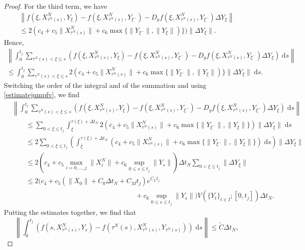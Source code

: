 \documentclass[reqno,12pt]{amsart}
\theoremstyle{plain} %
\theoremstyle{definition} %
\begin{document}
\begin{proof}
    For the third term, we have
    \begin{multline*}
        \left\|f(\xi, X_{\tau^N(s)}^N, Y_\xi) - f(\xi, X_{\tau^N(s)}^N, Y_{\xi^{-}}) - D_y f(\xi, X_{\tau^N(s)}^N, Y_{\xi^-})\Delta Y_\xi\right\| \\
        \leq 2(c_4 + c_5\|X_{\tau^N(s)}^N\| + c_6\max\{\|Y_{\xi^{-}}\|, \|Y_{\xi}\|)\})\|\Delta Y_\xi\|.
    \end{multline*}
    Hence,
    \begin{multline*}
        \left\|\int_0^{t_j} \sum_{\tau^N(s) < \xi \leq s} \left(f(\xi, X_{\tau^N(s)}^N, Y_\xi) - f(\xi, X_{\tau^N(s)}^N, Y_{\xi^{-}}) - D_y f(\xi, X_{\tau^N(s)}^N, Y_{\xi^-})\Delta Y_\xi\right)\;\mathrm{d}s\right\| \\
        \leq \int_0^{t_j} \sum_{\tau^N(s) < \xi \leq s} 2(c_4 + c_5\|X_{\tau^N(s)}^N\| + c_6\max\{\|Y_{\xi^{-}}\|, \|Y_{\xi}\|)\}\|\Delta Y_\xi\|\;\mathrm{d}s.
    \end{multline*}
    Switching the order of the integral and of the summation and using \eqref{estimatejumpfv}, we find
    \begin{align*}
        & \left\|\int_0^{t_j} \sum_{\tau^N(s) < \xi \leq s} \left(f(\xi, X_{\tau^N(s)}^N, Y_\xi) - f(\xi, X_{\tau^N(s)}^N, Y_{\xi^{-}}) - D_y f(\xi, X_{\tau^N(s)}^N, Y_{\xi^-})\Delta Y_\xi\right)\;\mathrm{d}s\right\| \\
        & \qquad \leq \sum_{0 < \xi \leq t_j} \int_{\xi}^{\tau(\xi)+\Delta t_N} 2\left(c_4 + c_5\|X_{\tau^N(s)}^N\| + c_6\max\{\|Y_{\xi^{-}}\|, \|Y_{\xi}\|\}\right)\|\Delta Y_\xi\|\;\mathrm{d}s \\
        & \qquad \leq 2 \sum_{0 < \xi \leq t_j} \left(\int_{\xi}^{\tau(\xi)+\Delta t_N} \left(c_4 + c_5\|X_{\tau^N(s)}^N\| + c_6\max\{\|Y_{\xi^{-}}\|, \|Y_{\xi}\|\}\right)\;\mathrm{d}s \right)\|\Delta Y_\xi\| \\
        & \qquad \leq 2\left(c_4 + c_5\max_{i=0, \ldots, j}\|X_i^N\| + c_6\sup_{0\leq s \leq t_j}\|Y_s\|\right) \Delta t_N\sum_{0 < \xi \leq t_j} \|\Delta Y_\xi\| \\
        & \qquad \leq 2\bigg(c_4 + c_5\left(\|X_0\| + C_0\Delta t_N + C_M t_j \right)e^{C_L t_j} \\
        & \hspace{3in} + c_6\sup_{0\leq s \leq t_j}\|Y_s\|\bigg) V(\{Y_t\}_{t\in I}; [0, t_j]) \Delta t_N.
    \end{align*}
    Putting the estimates together, we find that
    \[
        \left\|\int_0^{t_j} \left( f(s, X_{\tau^N(s)}^N, Y_s) - f(\tau^N(s), X_{\tau^N(s)}^N, Y_{\tau^N(s)}) \right)\;\mathrm{d}s\right\| \leq \tilde C \Delta t_N,
\]
\end{proof}
\end{document}
